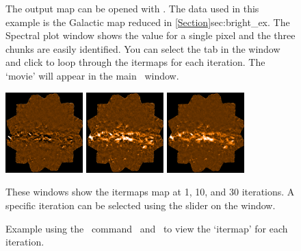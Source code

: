 \documentclass[11pt,oneside,chapters]{starlink}
\begin{document}
\begin{latexonly}
\begin{figure}[ht!]
\begin{center}
\begin{fmpage}{0.95\linewidth}
\begin{minipage}[c]{0.65\linewidth}
\end{minipage}
\hspace{0.3cm}
\begin{minipage}[c]{0.29\linewidth}
The output map  can be opened with \gaia. The data used
in this example is the Galactic map reduced in
\cref{Section}{sec:bright_ex}{}. The
Spectral plot window shows the value for a single pixel and the three
chunks are easily identified. You can select the  tab
in the  window and click
 to loop through the itermaps for each iteration.  The
`movie' will appear in the main \gaia\ window.
\end{minipage}

\vspace{0.7cm}

\begin{minipage}[c]{0.65\linewidth}
\centering
\includegraphics[width=3cm, ]{sc21_iter1}
\includegraphics[width=3cm, ]{sc21_iter2}
\includegraphics[width=3cm, ]{sc21_iter31}
\end{minipage}
\hspace{0.3cm}
\begin{minipage}[c]{0.29\linewidth}
These windows show the itermaps map at 1, 10, and 30 iterations. A
specific iteration can be selected using the 
slider on the  window.
\vspace{0.2cm}
\end{minipage}
\end{fmpage}
\end{center}
\caption[View maps for each iteration]{
  \small Example using the \smurf\ command \stackframes\ and
  \gaia\ to view the `itermap' for each iteration.
}
\label{fig:stack}
\end{figure}
\end{latexonly}
\end{document}
